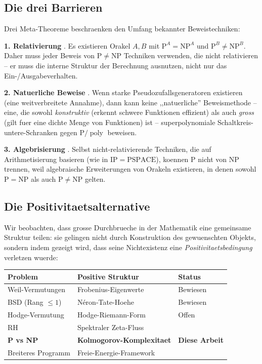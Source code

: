 \documentclass[aps,prd,twocolumn,superscriptaddress,nofootinbib]{revtex4-2}
\theoremstyle{definition}
\theoremstyle{remark}
\DeclareMathOperator{\poly}{poly}
\newcommand{\NP}{\mathrm{NP}}
\newcommand{\PP}{\mathrm{P}}
\begin{document}
\subsection{Die drei Barrieren}

Drei Meta-Theoreme beschraenken den Umfang bekannter Beweistechniken:

\textbf{1. Relativierung} \cite{BakerGillSolovay1975}. Es existieren Orakel $A, B$ mit $\PP^A = \NP^A$ und $\PP^B \neq \NP^B$. Daher muss jeder Beweis von $\PP \neq \NP$ Techniken verwenden, die nicht relativieren -- er muss die interne Struktur der Berechnung ausnutzen, nicht nur das Ein-/Ausgabeverhalten.

\textbf{2. Natuerliche Beweise} \cite{RazborovRudich1997}. Wenn starke Pseudozufallsgeneratoren existieren (eine weitverbreitete Annahme), dann kann keine ,,natuerliche'' Beweismethode -- eine, die sowohl \textit{konstruktiv} (erkennt schwere Funktionen effizient) als auch \textit{gross} (gilt fuer eine dichte Menge von Funktionen) ist -- superpolynomiale Schaltkreis-untere-Schranken gegen $\PP/\poly$ beweisen.

\textbf{3. Algebrisierung} \cite{AaronsonWigderson2009}. Selbst nicht-relativierende Techniken, die auf Arithmetisierung basieren (wie in $\mathrm{IP} = \mathrm{PSPACE}$), koennen $\PP$ nicht von $\NP$ trennen, weil algebraische Erweiterungen von Orakeln existieren, in denen sowohl $\PP = \NP$ als auch $\PP \neq \NP$ gelten.

\subsection{Die Positivitaetsalternative}

Wir beobachten, dass grosse Durchbrueche in der Mathematik eine gemeinsame Struktur teilen: sie gelingen nicht durch Konstruktion des gewuenschten Objekts, sondern indem gezeigt wird, dass seine Nichtexistenz eine \textit{Positivitaetsbedingung} verletzen wuerde:

\begin{center}
\begin{tabular}{lll}
\hline
Problem & Positive Struktur & Status \\
\hline
Weil-Vermutungen & Frobenius-Eigenwerte & Bewiesen \\
BSD (Rang $\leq 1$) & N\'eron-Tate-Hoehe & Bewiesen \\
Hodge-Vermutung & Hodge-Riemann-Form & Offen \\
RH & Spektraler Zeta-Fluss & \cite{GeigerRH2026c} \\
\textbf{P vs NP} & \textbf{Kolmogorov-Komplexitaet} & \textbf{Diese Arbeit} \\
Breiteres Programm & Freie-Energie-Framework & \cite{FST-Unified2026} \\
\hline
\end{tabular}
\end{center}
\end{document}
